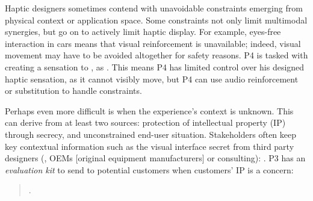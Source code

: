 \label{sec:interviews:constraints}
Haptic designers sometimes contend with unavoidable constraints emerging from physical context or application space.
Some constraints not only limit multimodal synergies, but go on to %
actively limit haptic display.
%
For example, eyes-free interaction in cars means that visual reinforcement is unavailable; indeed, visual movement may have to be avoided altogether for safety reasons.
P4 %
is tasked with creating a  sensation to , as . 
This means P4 has limited control over his designed haptic sensation, as it cannot visibly move, but P4 can use audio reinforcement or substitution to handle constraints. %

Perhaps even more difficult is when the experience's context is unknown.
This can derive from at least two sources: %
protection of intellectual property (IP) through secrecy, %
and unconstrained end-user situation.
%
Stakeholders often keep key contextual information such as the visual interface secret from third party designers (\eg, OEMs [original equipment manufacturers] or consulting): 
.
P3 has %
an \emph{evaluation kit} to send to potential customers when customers' IP is a concern: %

\begin{quote}
.
\end{quote}

